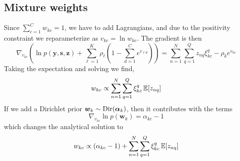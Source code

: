\documentclass{article}
\newcommand{\source}{s}
\newcommand{\sourcevec}{\bm{\source}}
\newcommand{\obs}{y}
\newcommand{\obsvec}{\bm{\obs}}
\newcommand{\weight}{w}
\newcommand{\weightvec}{\bm{\weight}}
\newcommand{\assign}{z}
\newcommand{\assignvec}{\bm{\assign}}
\begin{document}
\subsection{Mixture weights}
Since $\sum_{c=1}^{C}\weight_{kc}=1$, we have to add Lagrangians, and due to the positivity constraint we reparameterize as $v_{kc}=\ln\weight_{kc}$. The gradient is then  
\begin{equation}
\nabla_{v_{kc}}\left(\ln p(\obsvec,\sourcevec,\assignvec) +\sum_{\ell=1}^{K}\rho_\ell(1-\sum_{d=1}^{C}e^{v_{\ell d}})\right)=\sum_{n=1}^N\sum_{q=1}^Q\assign_{nq}\xi_{kc}^q-\rho_ke^{v_{kc}}
\end{equation}
Taking the expectation and solving we find,
\begin{equation}
\weight_{kc}\propto\sum_{n=1}^{N}\sum_{q=1}^Q\xi_{kc}^q\E{\assign_{nq}}
\end{equation}
If we add a Dirichlet prior $\weightvec_k\sim\dirrnd(\bm{\alpha}_k)$, then it contributes with the terms 
\begin{equation}
\nabla_{v_{kc}}\ln p(\weightvec_k)=\alpha_{kc}-1
\end{equation}
which changes the analytical solution to
\begin{equation}
\weight_{kc}\propto (\alpha_{kc}-1)+\sum_{n=1}^{N}\sum_{q=1}^Q\xi_{kc}^q\E{\assign_{nq}}
\end{equation}
\end{document}
